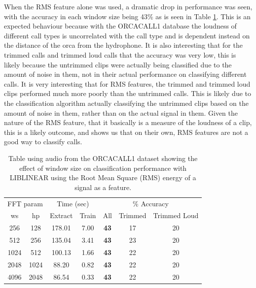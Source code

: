 \documentclass[12pt,oneside]{book}
\begin{document}
When the RMS feature alone was used, a dramatic drop in performance
was seen, with the accuracy in each window size being 43\% as is seen
in Table \ref{table:calls-different-rms}.  This is an expected
behaviour because with the ORCACALL1 database the loudness of
different call types is uncorrelated with the call type and is
dependent instead on the distance of the orca from the hydrophone.  It
is also interesting that for the trimmed calls and trimmed loud calls
that the accuracy was very low, this is likely because the untrimmed
clips were actually being classified due to the amount of noise in
them, not in their actual performance on classifying different calls.
It is very interesting that for RMS features, the trimmed and trimmed
loud clips performed much more poorly than the untrimmed calls.  This
is likely due to the classification algorithm actually classifying the
untrimmed clips based on the amount of noise in them, rather than on
the actual signal in them.  Given the nature of the RMS feature, that
it basically is a measure of the loudness of a clip, this is a likely
outcome, and shows us that on their own, RMS features are not a good
way to classify calls.

\begin{table}
\begin{tabular}{|c|c|c|c|c|c|c|}
\hline
\multicolumn{2}{|c|}{FFT param} & \multicolumn{2}{c|}{Time (sec)} & \multicolumn{3}{c|}{\% Accuracy} \\
\hhline{|-|-|-|-|-|-|-|}
ws & hp & Extract & Train & All & Trimmed & Trimmed Loud \\
\hhline{|=|=|=|=|=|=|=|}
256 & 128        &   178.01  &    7.00  &    \textbf{43}  & 17 & 20 \\
512 & 256        &   135.04  &    3.41  &    \textbf{43}  & 23 & 20 \\
1024 & 512       &   100.13  &    1.66  &    \textbf{43}  & 22 & 20 \\
2048 & 1024      &    88.20  &    0.82  &    \textbf{43}  & 22 & 20  \\
4096 & 2048      &    86.54  &    0.33  &    \textbf{43}  & 22 & 20 \\
\hline
\end{tabular}
\caption{Table using audio from the ORCACALL1 dataset showing the
  effect of window size on classification performance with LIBLINEAR
  using the Root Mean Square (RMS) energy of a signal as a feature.}
\label{table:calls-different-rms}
\end{table}
\end{document}
